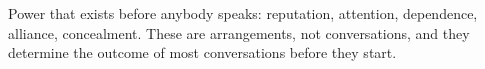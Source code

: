 
\begin{partblurb}
Power that exists before anybody speaks: reputation, attention, dependence, alliance, concealment. These are arrangements, not conversations, and they determine the outcome of most conversations before they start.
\end{partblurb}
